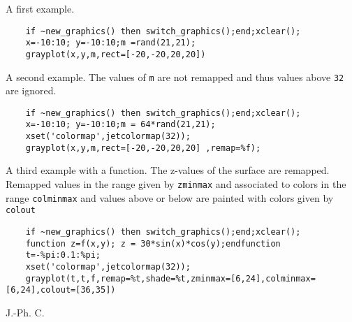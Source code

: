 \begin{examples}

\noindent A first example.
  \begin{Verbatim}
    if ~new_graphics() then switch_graphics();end;xclear();
    x=-10:10; y=-10:10;m =rand(21,21);
    grayplot(x,y,m,rect=[-20,-20,20,20])
  \end{Verbatim}

\noindent A second example. The values of \verb!m! are not remapped and
thus values above \verb!32! are ignored.

  \begin{Verbatim}
    if ~new_graphics() then switch_graphics();end;xclear();
    x=-10:10; y=-10:10;m = 64*rand(21,21);
    xset('colormap',jetcolormap(32));
    grayplot(x,y,m,rect=[-20,-20,20,20] ,remap=%f);
  \end{Verbatim}

\noindent A third example with a function. The z-values of the surface are remapped.
Remapped values in the range given by \verb!zminmax! and associated to colors in the range
\verb!colminmax! and values above or below are painted with colors given by \verb!colout!

  \begin{Verbatim}
    if ~new_graphics() then switch_graphics();end;xclear();
    function z=f(x,y); z = 30*sin(x)*cos(y);endfunction
    t=-%pi:0.1:%pi;
    xset('colormap',jetcolormap(32));
    grayplot(t,t,f,remap=%t,shade=%t,zminmax=[6,24],colminmax=[6,24],colout=[36,35])
  \end{Verbatim}
\end{examples}

\begin{manseealso}
     
\end{manseealso}


\begin{authors}
  J.-Ph. C.
\end{authors}
